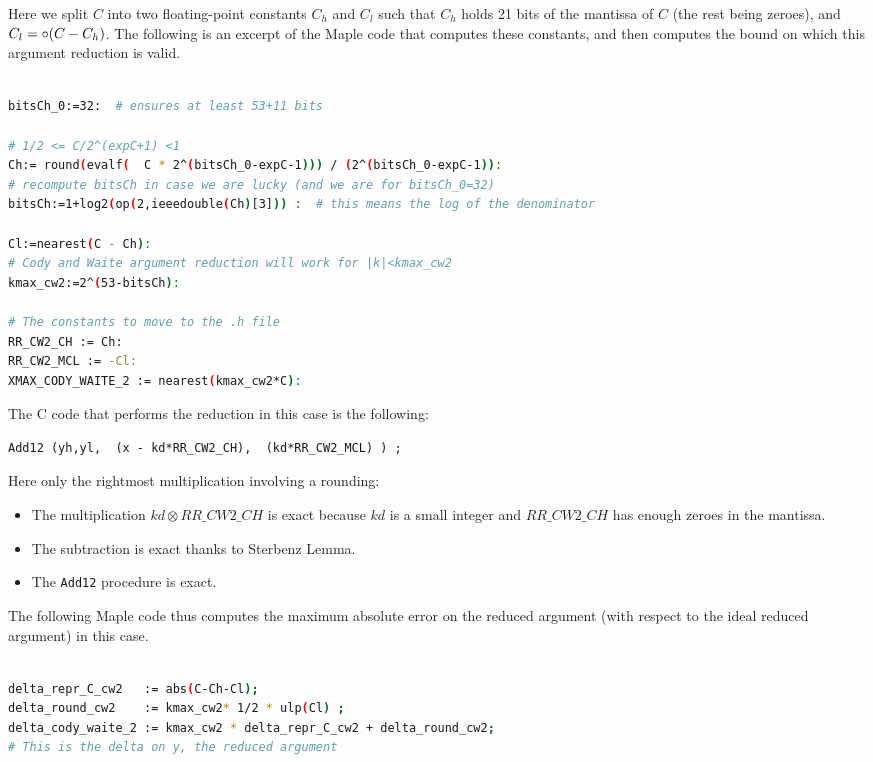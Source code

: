 Here we split $C$ into two floating-point constants $C_h$ and $C_l$
such that $C_h$ holds 21 bits of the mantissa of $C$ (the rest being
zeroes), and $C_l=\circ(C-C_h)$.  The following is an excerpt of the
Maple code that computes these constants, and then computes the
bound on which this argument reduction is valid.

\begin{lstlisting}[caption={Maple script for computing constants for Cody and Waite 2},
  firstnumber=1,  language={sh}, numbers=none]% of course it's maple
%Skip a line here, I don't know why, otherwise latex eats the first line

bitsCh_0:=32:  # ensures at least 53+11 bits

# 1/2 <= C/2^(expC+1) <1
Ch:= round(evalf(  C * 2^(bitsCh_0-expC-1))) / (2^(bitsCh_0-expC-1)):
# recompute bitsCh in case we are lucky (and we are for bitsCh_0=32)
bitsCh:=1+log2(op(2,ieeedouble(Ch)[3])) :  # this means the log of the denominator

Cl:=nearest(C - Ch):
# Cody and Waite argument reduction will work for |k|<kmax_cw2
kmax_cw2:=2^(53-bitsCh):

# The constants to move to the .h file
RR_CW2_CH := Ch:
RR_CW2_MCL := -Cl:
XMAX_CODY_WAITE_2 := nearest(kmax_cw2*C):
\end{lstlisting}

The C code that performs the reduction in this case is the following:

\begin{lstlisting}[caption={Cody and Waite argument reduction with two
    constants},firstnumber=27]
	Add12 (yh,yl,  (x - kd*RR_CW2_CH),  (kd*RR_CW2_MCL) ) ;
\end{lstlisting}

Here only the rightmost multiplication involving a rounding: 
\begin{itemize}
\item The multiplication $\mathit{kd}\otimes \mathit{RR\_CW2\_CH}$ is
  exact because $kd$ is a small integer and $\mathit{RR\_CW2\_CH}$
  has enough zeroes in the mantissa.
\item The subtraction is exact thanks to Sterbenz Lemma.
\item The \texttt{Add12} procedure is exact.
\end{itemize}

The following Maple code thus computes the maximum absolute error on
the reduced argument (with respect to the ideal reduced argument) in
this case.
\begin{lstlisting}[caption={Maple script for computing absolute error for Cody and Waite 2},
  firstnumber=1,  language={sh}, numbers=none]% of course it's maple

delta_repr_C_cw2   := abs(C-Ch-Cl);
delta_round_cw2    := kmax_cw2* 1/2 * ulp(Cl) ;
delta_cody_waite_2 := kmax_cw2 * delta_repr_C_cw2 + delta_round_cw2;
# This is the delta on y, the reduced argument
\end{lstlisting}


